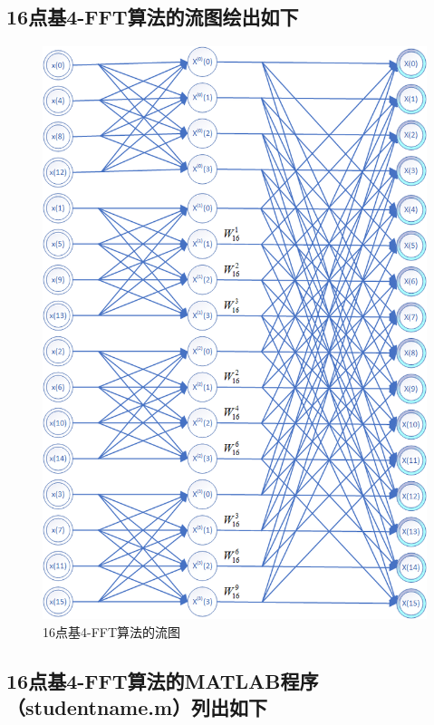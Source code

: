 \documentclass{../source/zjureport}
\begin{document}
        \subsection{16点基4-FFT算法的流图绘出如下}
        \begin{figure}[H]
            \centering
            \includegraphics[scale = 0.7]{figure/流图.png}
            \caption{16点基4-FFT算法的流图}
        \end{figure}

        \subsection{16点基4-FFT算法的MATLAB程序（studentname.m）列出如下}
        
\end{document}
